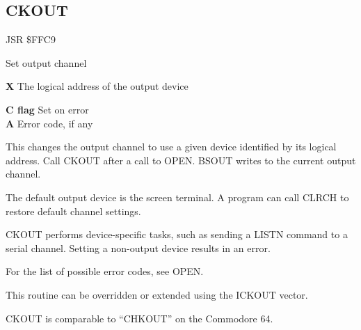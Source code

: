 
\newpage
\subsection{CKOUT}
\label{KERNAL Jump Table!CKOUT}
\begin{description}[leftmargin=2cm,style=nextline]
    \item [Address:] JSR \$FFC9
    \item [Description:] Set output channel
    \item [Inputs:]
        \textbf{X} The logical address of the output device
    \item [Outputs:]
        \textbf{C flag} Set on error \\
        \textbf{A} Error code, if any
    \item [Remarks:]
        This changes the output channel to use a given device identified by its logical address. Call CKOUT after a call to OPEN. BSOUT writes to the current output channel.

        The default output device is the screen terminal. A program can call CLRCH to restore default channel settings.

        CKOUT performs device-specific tasks, such as sending a LISTN command to a serial channel. Setting a non-output device results in an error.

        For the list of possible error codes, see OPEN.

        This routine can be overridden or extended using the ICKOUT vector.

        CKOUT is comparable to ``CHKOUT'' on the Commodore 64.
    \item [Example:]
\end{description}



\newpage
